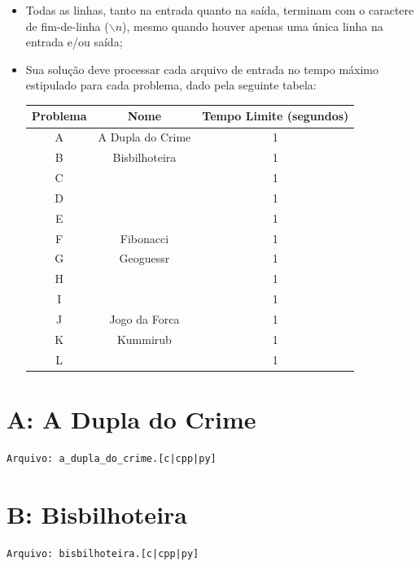 \documentclass[12pt,oneside]{article} %
\begin{document}
\begin{itemize}
    \item Todas as linhas, tanto na entrada quanto na saída, terminam com o
    caractere de fim-de-linha ($\backslash n$), mesmo quando houver apenas uma única
    linha na entrada e/ou saída;

    \newpage
    \item Sua solução deve processar cada arquivo de entrada no tempo máximo
    estipulado para cada problema, dado pela seguinte tabela:

    \begin{table}[h]
    \centering
    \begin{tabular}{|c|c||c|}
    \hline
    \textbf{Problema} & \textbf{Nome} & \textbf{Tempo Limite (segundos)} \\
    \hline
    A & A Dupla do Crime & 1 \\
    B & Bisbilhoteira & 1 \\
    C &  & 1 \\
    D &  & 1 \\
    E &  & 1 \\
    F & Fibonacci & 1 \\
    G & Geoguessr & 1 \\
    H &  & 1 \\
    I &  & 1 \\
    J & Jogo da Forca & 1 \\
    K & Kummirub & 1 \\
    L &  & 1 \\
    \hline
    \end{tabular}
    \end{table}

\end{itemize}

\newpage
\section*{A: A Dupla do Crime} %
\vspace{-0.52cm}
\noindent \begin{verbatim}Arquivo: a_dupla_do_crime.[c|cpp|py]\end{verbatim}


\newpage
\section*{B: Bisbilhoteira} %
\vspace{-0.52cm}
\noindent \begin{verbatim}Arquivo: bisbilhoteira.[c|cpp|py]\end{verbatim}

\end{document}
